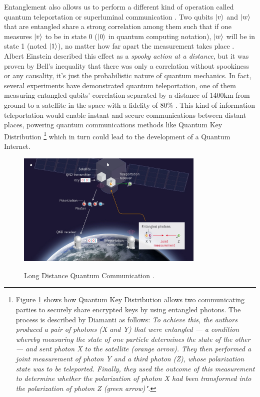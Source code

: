\documentclass[12pt,a4paper]{scrartcl}
\begin{document}
Entanglement also allows us to perform a different kind of operation called quantum teleportation \cite{Ren2017} or superluminal communication \cite{bernhardt2019quantum}. Two qubits $\ket{v}$ and $\ket{w}$ that are entangled share a strong correlation among them such that if one measures $\ket{v}$ to be in state 0 ($\ket{0}$ in quantum computing notation), $\ket{w}$ will be in state 1 (noted $\ket{1}$), no matter how far apart the measurement takes place \cite{youtube:Morello2016}. Albert Einstein described this effect as a \textit{spooky action at a distance}, but it was proven by Bell's inequality \cite{Bell1964} that there was only a correlation without spookiness or any causality, it's just the probabilistic nature of quantum mechanics. In fact, several experiments have demonstrated quantum teleportation, one of them measuring entangled qubits' correlation separated by a distance of 1400km from ground to a satellite in the space with a fidelity of 80\% \cite{Ren2017}. This kind of information teleportation would enable instant and secure communications between distant places, powering quantum communications methods like Quantum Key Distribution
\footnote{Figure \ref{fig:qkd} shows how Quantum Key Distribution allows two communicating parties to securely share encrypted keys by using entangled photons. The process is described by Diamanti \cite{Diamanti2017} as follows: \textit{To achieve this, the authors produced a pair of photons (X and Y) that were entangled — a condition whereby measuring the state of one particle determines the state of the other — and sent photon X to the satellite (orange arrow). They then performed a joint measurement of photon Y and a third photon (Z), whose polarization state was to be teleported. Finally, they used the outcome of this measurement to determine whether the polarization of photon X had been transformed into the polarization of photon Z (green arrow)".}}
which in turn could lead to the development of a Quantum Internet.
\begin{figure}[ht]
    \caption{Long Distance Quantum Communication \cite{Diamanti2017}.}
    \includegraphics[width=0.8\textwidth]{images/2-QKD_diagram.png}
    \label{fig:qkd}
\end{figure}
\end{document}
